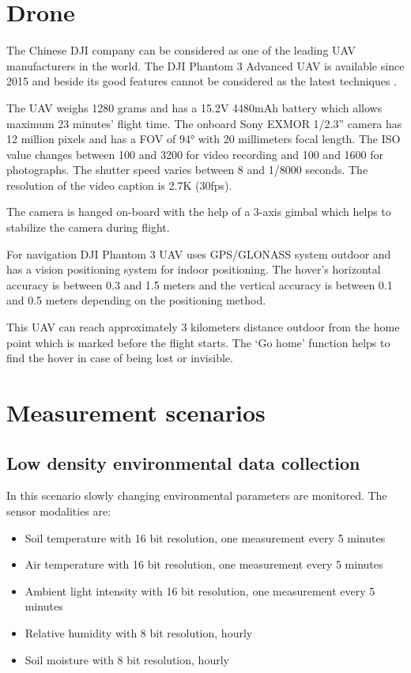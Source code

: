 \documentclass[conference]{IEEEtran}
\begin{document}
\section{Drone}

The Chinese DJI company can be considered as one of the leading UAV
manufacturers in the world. The DJI Phantom 3 Advanced UAV is available since
2015 and beside its good features cannot be considered as the latest techniques
\cite{udvardy2019}.

The UAV weighs 1280 grams and has a 15.2V 4480mAh battery which allows maximum
23 minutes’ flight time. The onboard Sony EXMOR 1/2.3” camera has 12 million
pixels and has a FOV of 94° with 20 millimeters focal length. The ISO value
changes between 100 and 3200 for video recording and 100 and 1600 for
photographs. The shutter speed varies between 8 and 1/8000 seconds. The
resolution of the video caption is 2.7K (30fps).

The camera is hanged on-board with the help of a 3-axis gimbal which helps to
stabilize the camera during flight. 

For navigation DJI Phantom 3 UAV uses GPS/GLONASS system outdoor and has a
vision positioning system for indoor positioning. The hover’s horizontal
accuracy is between 0.3 and 1.5 meters and the vertical accuracy is between 0.1
and 0.5 meters depending on the positioning method.

This UAV can reach approximately 3 kilometers distance outdoor from the home
point which is marked before the flight starts. The ‘Go home’ function helps to
find the hover in case of being lost or invisible.

\section{Measurement scenarios}

\subsection{Low density environmental data collection}

In this scenario slowly changing environmental parameters are monitored. The sensor modalities are:

\begin{itemize}

  \item{Soil temperature with 16 bit resolution, one measurement every 5 minutes}
  \item{Air temperature with 16 bit resolution, one measurement every 5 minutes}
  \item{Ambient light intensity with 16 bit resolution, one measurement every 5 minutes}
  \item{Relative humidity with 8 bit resolution, hourly}
  \item{Soil moisture with 8 bit resolution, hourly}

\end{itemize}
\end{document}
